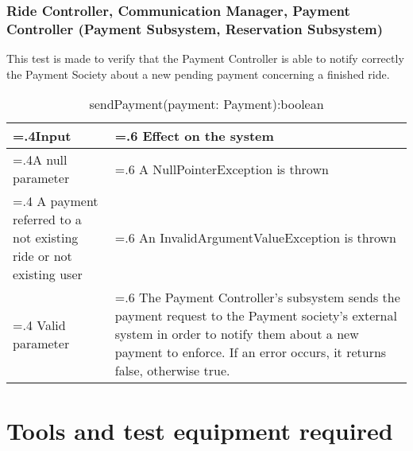 \documentclass[10pt, a4paper,titlepage]{article}
\begin{document}
\pagebreak
\subsubsection{Ride Controller, Communication Manager, Payment Controller (Payment Subsystem, Reservation Subsystem)}
This test is made to verify that the Payment Controller is able to notify correctly the Payment Society about a new pending payment concerning a finished ride.
\begin{table}[h]
\caption{sendPayment(payment: Payment):boolean}
\begin{tabularx}{\textwidth}{|>{\hsize=.4\hsize}X|>{\hsize=.6\hsize}X|}
\hline
Input & Effect on the system\\
\hline
A null parameter & A NullPointerException is thrown\\
\hline
A payment referred to a not existing ride or not existing user & An InvalidArgumentValueException is thrown\\
\hline
Valid parameter & The Payment Controller’s subsystem sends the payment request to the Payment society’s external system in order to notify them about a new payment to enforce. If an error occurs, it returns false, otherwise true.\\
\hline
\end{tabularx}
\end{table}
\pagebreak
\section{Tools and test equipment required}
\end{document}
